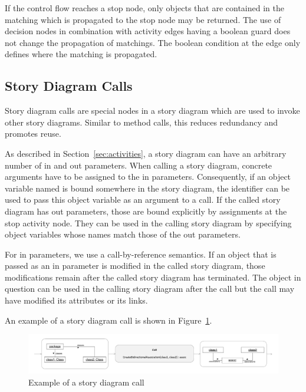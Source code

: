 If the control flow reaches a stop node, only objects that are contained in the matching which is propagated to the stop node may be returned. The use of decision nodes in combination with activity edges having a boolean guard does not change the propagation of matchings. The boolean condition at the edge only defines where the matching is propagated.

\subsection{Story Diagram Calls}
\label{sec:Calls}
Story diagram calls are special nodes in a story diagram which are used to invoke other story diagrams. Similar to method calls, this reduces redundancy and promotes reuse.

As described in Section~\ref{sec:activities}, a story diagram can have an arbitrary number of in and out parameters. When calling a story diagram, concrete arguments have to be assigned to the in parameters. Consequently, if an object variable named  is bound somewhere in the story diagram, the identifier  can be used to pass this object variable as an argument to a call. If the called story diagram has out parameters, those are bound explicitly by assignments at the stop activity node. They can be used in the calling story diagram by specifying object variables whose names match those of the out parameters.

For in parameters, we use a call-by-reference semantics. If an object that is passed as an in parameter is modified in the called story diagram, those modifications remain after the called story diagram has terminated. The object in question can be used in the calling story diagram after the call but the call may have modified its attributes or its links.

An example of a story diagram call is shown in Figure~\ref{fig:call}.

\begin{figure}[htb]
\begin{center}
  \includegraphics[width=\textwidth]{figures/StoryDiagramCall}
  \caption{Example of a story diagram call}
  \label{fig:call}
\end{center}
\end{figure}

